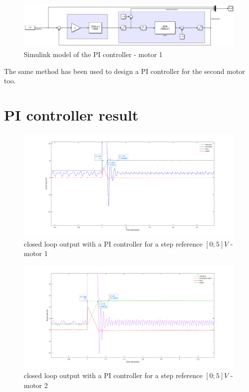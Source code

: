 \begin{figure}
    \centering
    \includegraphics[width=\textwidth]{Pictures/single_PI_simulink.png}
    \caption{Simulink model of the PI controller - motor 1}
    \label{fig:simulink single PI}
\end{figure}


The same method has been used to design a PI controller for the second motor too.

\section{PI controller result}

\begin{figure}
    \centering
    \includegraphics[width=\textwidth]{Pictures/stepRef_motor1.png}
    \caption{closed loop output with a PI controller for a step reference $[0; 5] V$ - motor 1}
    \label{fig:step reference motor 1}
\end{figure}

\begin{figure}
    \centering
    \includegraphics[width=\textwidth]{Pictures/stepRef_motor2.png}
    \caption{closed loop output with a PI controller for a step reference $[0; 5] V$ - motor 2}
    \label{fig:step reference motor 2}
\end{figure}

